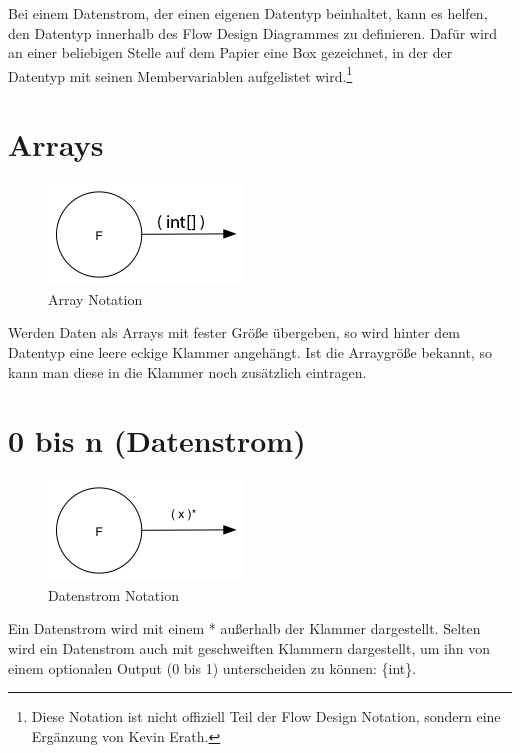 Bei einem Datenstrom, der einen eigenen Datentyp beinhaltet, kann es helfen, den Datentyp innerhalb des Flow Design Diagrammes zu definieren.
Dafür wird an einer beliebigen Stelle auf dem Papier eine Box gezeichnet,
in der der Datentyp mit seinen Membervariablen aufgelistet wird.\footnote{Diese Notation ist nicht offiziell Teil der Flow Design Notation,
sondern eine Ergänzung von Kevin Erath.}

\section{Arrays}

\begin{figure}[H]
	\centering
		\includegraphics[width=.5\linewidth]{./img/diagramArray.png}
	\caption{Array Notation}
\end{figure}

Werden Daten als Arrays mit fester Größe übergeben, so wird hinter dem Datentyp eine leere eckige Klammer angehängt.
Ist die Arraygröße bekannt, so kann man diese in die Klammer noch zusätzlich eintragen.



\section{0 bis n (Datenstrom)}


\begin{figure}[H]
	\centering
	\includegraphics[width=.5\linewidth]{./img/diagram0n.png}
	\caption{Datenstrom Notation}
\end{figure}



Ein Datenstrom wird mit einem * außerhalb der Klammer dargestellt.
Selten wird ein Datenstrom auch mit geschweiften Klammern dargestellt, um ihn
von einem optionalen Output (0 bis 1) unterscheiden zu können: \{int\}.

